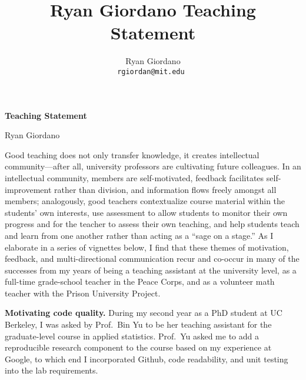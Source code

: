 

\usepackage{enumitem}

\usepackage{geometry}
\geometry{top=0.9in}
\geometry{left=1.0in}
\geometry{right=1.0in}


\title{Ryan Giordano Teaching Statement}

\author{
  Ryan Giordano \\ \texttt{rgiordan@mit.edu }
}




\begin{minipage}[t]{0.5\textwidth}
\hspace{-2em} %
{\bf \LARGE Teaching Statement}\\
\end{minipage}
\begin{minipage}[t]{0.5\textwidth}
        \hspace{8em} %
        {\LARGE Ryan Giordano}
\end{minipage}

Good teaching does not only transfer knowledge, it creates intellectual
community---after all, university professors are cultivating future colleagues.
In an intellectual community, members are self-motivated, feedback facilitates
self-improvement rather than division, and information flows freely amongst all
members; analogously, good teachers contextualize course material within the
students' own interests, use assessment to allow students to monitor their own
progress and for the teacher to assess their own teaching, and help students
teach and learn from one another rather than acting as a ``sage on a stage.'' As
I elaborate in a series of vignettes below, I find that these themes of
motivation, feedback, and multi-directional communication recur and co-occur in
many of the successes from my years of being a teaching assistant at the
university level, as a full-time grade-school teacher in the Peace Corps, and as
a volunteer math teacher with the Prison University Project.

\textbf{Motivating code quality.}
During my second year as a PhD student at UC Berkeley, I was asked by Prof.\ Bin
Yu to be her teaching assistant for the graduate-level course in applied
statistics. Prof.\ Yu asked me to add a reproducible research component to the
course based on my experience at Google, to which end I incorporated Github,
code readability, and unit testing into the lab requirements.

